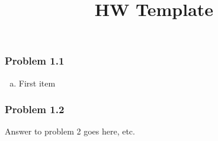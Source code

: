 \documentclass[12pt,letterpaper]{article}
\title{HW Template}
\newcommand\asgnname{1}         %
\newenvironment{answer}[1]{
  \subsubsection*{Problem \asgnname.#1}
}{\newpage}
\begin{document}
\begin{answer}{1}
	\begin{enumerate}[a.]
    	\item First item
    \end{enumerate}
\end{answer}

\begin{answer}{2}
Answer to problem 2 goes here, etc.
\end{answer}
\end{document}

